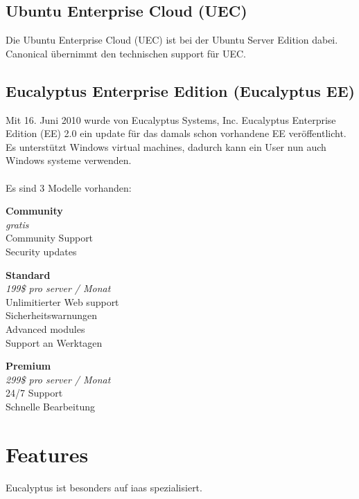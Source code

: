 \documentclass[a4paper,nochapterprefix,ngerman,12pt]{scrreprt}
\begin{document}
\subsection{Ubuntu Enterprise Cloud (UEC)}
Die Ubuntu Enterprise Cloud (UEC) ist bei der Ubuntu Server Edition dabei. Canonical übernimmt den technischen support für UEC. \cite{EucalyptusBegGuide}
\subsection{Eucalyptus Enterprise Edition (Eucalyptus EE)}
Mit 16. Juni 2010 wurde von  Eucalyptus Systems, Inc. Eucalyptus Enterprise Edition (EE) 2.0 ein update für das damals schon vorhandene EE veröffentlicht. Es unterstützt Windows virtual machines, dadurch kann ein User nun auch Windows systeme verwenden. \cite{EucalyptusEELaunch}\\ \\
Es sind 3 Modelle vorhanden: \\
\begin{minipage}[t]{.2\textwidth}
\textbf{Community} \\
\textit{gratis} \\
Community Support\\
Security updates
\end{minipage}
\begin{minipage}[t]{.05\textwidth}
\hspace{1.0\textwidth}
\end{minipage}
\begin{minipage}[t]{.3\textwidth}
\textbf{Standard} \\
\textit{199\$ pro server / Monat} \\
Unlimitierter Web support \\
Sicherheitswarnungen \\
Advanced modules \\
Support an Werktagen
\end{minipage}
\begin{minipage}[t]{.05\textwidth}
\hspace{1.0\textwidth}
\end{minipage}
\begin{minipage}[t]{.3\textwidth}
\textbf{Premium} \\
\textit{299\$ pro server / Monat} \\
24/7 Support \\
Schnelle Bearbeitung
\end{minipage}
\cite{EucalyptusPric}
\section{Features}
Eucalyptus ist besonders auf \gls{iaas} spezialisiert.
\end{document}
